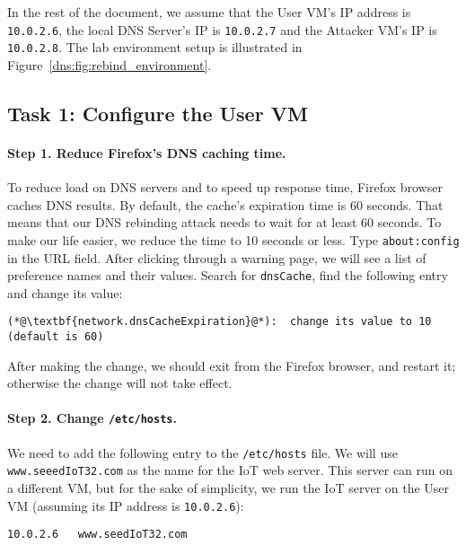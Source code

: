 In the rest of the document, we assume that the User VM's IP address is
{\tt 10.0.2.6}, the local DNS Server's IP is {\tt 10.0.2.7} and the Attacker
VM's IP is {\tt 10.0.2.8}. The lab environment setup is illustrated
in Figure~\ref{dns:fig:rebind_environment}. 



\subsection{Task 1: Configure the User VM}

\paragraph{Step 1. Reduce Firefox's DNS caching time.}
To reduce load on DNS servers and to speed up response time, Firefox browser caches DNS
results.  By default, the cache's expiration time is 60 seconds. That means that our DNS
rebinding attack needs to wait for at least 60 seconds. To make our life easier, we reduce
the time to 10 seconds or less. Type \texttt{about:config} in the URL field.
After clicking through a warning page, we will see a list of preference names and their values.
Search for \texttt{dnsCache}, find the following entry and change its value:

\begin{lstlisting}
(*@\textbf{network.dnsCacheExpiration}@*):  change its value to 10 (default is 60)
\end{lstlisting}

After making the change, we should exit from the Firefox browser, and restart it; otherwise the
change will not take effect.



\paragraph{Step 2. Change \texttt{/etc/hosts}.}
We need to add the following entry to the \texttt{/etc/hosts} file. 
We will use \texttt{www.seeedIoT32.com} as the name for the 
IoT web server. This server can run on a different VM, but for the 
sake of simplicity, we run the IoT server on the User VM (assuming 
its IP address is \texttt{10.0.2.6}): 


\begin{lstlisting}
10.0.2.6   www.seedIoT32.com
\end{lstlisting}
 


